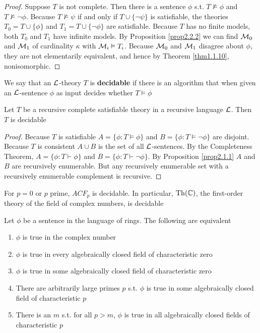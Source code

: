 \documentclass[11pt]{article}
\begin{document}
\begin{proof}
Suppose \(T\) is not complete. Then there is a sentence \(\phi\) s.t. 
\(T\not\vDash\phi\) and \(T\not\vDash\neg\phi\). Because
\(T\not\vDash\psi\) if and only if \(T\cup\{\neg\psi\}\) is satisfiable, the
theories \(T_0=T\cup\{\phi\}\) and \(T_1=T\cup\{\neg\phi\}\) are satisfiable.
Because \(T\) has no finite models, both \(T_0\) and \(T_1\) have infinite
models. By Proposition \ref{prop2.2.2} we can find \(\mathcal{M}_0\) and
\(\mathcal{M}_1\) of cardinality \(\kappa\) with \(\mathcal{M}_i\vDash T_i\). Because \(\mathcal{M}_0\)
and \(\mathcal{M}_1\) disagree about \(\phi\), they are not elementarily equivalent, and
hence by Theorem \ref{thm1.1.10}, nonisomorphic. 
\end{proof}

\begin{definition}[]
We say that an \(\mathcal{L}\)-theory \(T\) is \textbf{decidable} if there is an algorithm
that when given an \(\mathcal{L}\)-sentence \(\phi\) as input decides whether \(T\vDash\phi\)
\end{definition}

\begin{lemma}[]
\label{lemma2.2.8}
Let \(T\) be a recursive complete satisfiable theory in a recursive language
\(\mathcal{L}\). Then \(T\) is decidable
\end{lemma}

\begin{proof}
Because \(T\) is satisfiable \(A=\{\phi:T\vDash\phi\}\) and
\(B=\{\phi:T\vDash\neg\phi\}\) are disjoint. Because \(T\) is consistent 
\(A\cup B\) is the set of all \(\mathcal{L}\)-sentences. By the Completeness
Theorem, \(A=\{\phi:T\vdash\phi\}\) and \(B=\{\phi:T\vdash\neg\phi\}\). By
Proposition \ref{prop2.1.1} \(A\) and \(B\) are recursively enumerable. But any
recursively enumerable set with a recursively enumerable complement is
recursive. 
\end{proof}

\begin{corollary}[]
For \(p=0\) or \(p\) prime, \(ACF_p\) is decidable. In particular, \(\operatorname{Th}(\mathbb{C})\),
the first-order theory  of the field of complex numbers, is decidable
\end{corollary}

\begin{corollary}[]
Let \(\phi\) be a sentence in the language of rings. The following are equivalent
\begin{enumerate}
\item \(\phi\) is true in the complex number
\item \(\phi\) is true in every algebraically closed field of characteristic zero
\item \(\phi\) is true in some algebraically closed field of characteristic zero
\item There are arbitrarily large primes \(p\) s.t. \(\phi\) is true in some
algebraically closed field of characteristic \(p\)
\item There is an \(m\) s.t. for all \(p>m\), \(\phi\) is true in all algebraically
closed fields of characteristic \(p\)
\end{enumerate}
\end{corollary}
\end{document}
